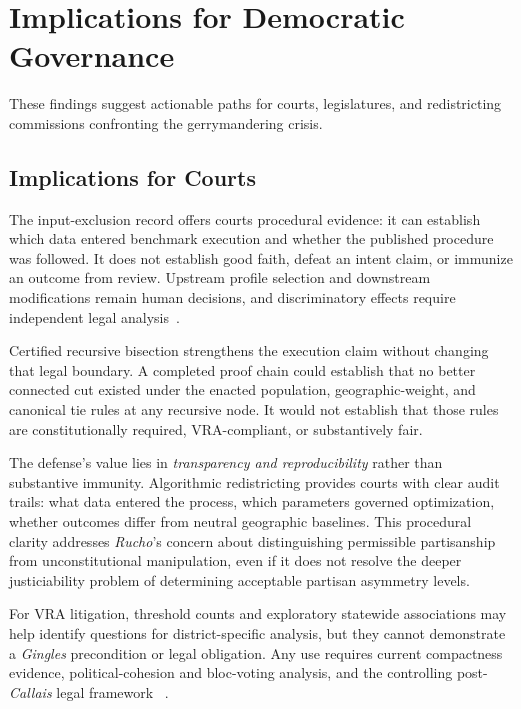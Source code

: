 \section{Implications for Democratic Governance}

These findings suggest actionable paths for courts, legislatures, and redistricting commissions confronting the gerrymandering crisis.

\subsection{Implications for Courts}

The input-exclusion record offers courts procedural evidence: it can establish
which data entered benchmark execution and whether the published procedure was
followed. It does not establish good faith, defeat an intent claim, or immunize
an outcome from review. Upstream profile selection and downstream modifications
remain human decisions, and discriminatory effects require independent legal
analysis~\cite{deluca2026edgeweighted}.

Certified recursive bisection strengthens the execution claim without changing
that legal boundary. A completed proof chain could establish that no better
connected cut existed under the enacted population, geographic-weight, and
canonical tie rules at any recursive node. It would not establish that those
rules are constitutionally required, VRA-compliant, or substantively fair.

The defense's value lies in \emph{transparency and reproducibility} rather than substantive immunity. Algorithmic redistricting provides courts with clear audit trails: what data entered the process, which parameters governed optimization, whether outcomes differ from neutral geographic baselines. This procedural clarity addresses \emph{Rucho}'s concern about distinguishing permissible partisanship from unconstitutional manipulation, even if it does not resolve the deeper justiciability problem of determining acceptable partisan asymmetry levels.

For VRA litigation, threshold counts and exploratory statewide associations may
help identify questions for district-specific analysis, but they cannot
demonstrate a \emph{Gingles} precondition or legal obligation. Any use requires
current compactness evidence, political-cohesion and bloc-voting analysis, and
the controlling post-\emph{Callais} legal framework
~\cite{deluca2026vra,deluca2026compactness,callais2026}.


